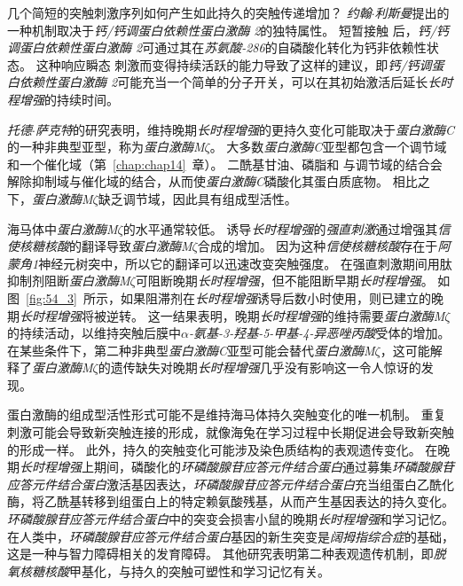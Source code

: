 几个简短的突触刺激序列如何产生如此持久的突触传递增加？
\textit{约翰$\cdot$利斯曼}提出的一种机制取决于\textit{钙/钙调蛋白依赖性蛋白激酶 2}的独特属性。
短暂接触  后，\textit{钙/钙调蛋白依赖性蛋白激酶 2}可通过其在\textit{苏氨酸-286}的自磷酸化转化为钙非依赖性状态。
这种响应瞬态  刺激而变得持续活跃的能力导致了这样的建议，即\textit{钙/钙调蛋白依赖性蛋白激酶 2}可能充当一个简单的分子开关，可以在其初始激活后延长\textit{长时程增强}的持续时间。


\textit{托德$\cdot$萨克特}的研究表明，维持晚期\textit{长时程增强}的更持久变化可能取决于\textit{蛋白激酶C}的一种非典型亚型，称为\textit{蛋白激酶M$\zeta$}。
大多数\textit{蛋白激酶C}亚型都包含一个调节域和一个催化域（第~\ref{chap:chap14}~章）。
二酰基甘油、磷脂和  与调节域的结合会解除抑制域与催化域的结合，从而使\textit{蛋白激酶C}磷酸化其蛋白质底物。
相比之下，\textit{蛋白激酶M$\zeta$}缺乏调节域，因此具有组成型活性。


海马体中\textit{蛋白激酶M$\zeta$}的水平通常较低。
诱导\textit{长时程增强}的\textit{强直刺激}通过增强其\textit{信使核糖核酸}的翻译导致\textit{蛋白激酶M$\zeta$}合成的增加。
因为这种\textit{信使核糖核酸}存在于\textit{阿蒙角1}神经元树突中，所以它的翻译可以迅速改变突触强度。
在强直刺激期间用肽抑制剂阻断\textit{蛋白激酶M$\zeta$}可阻断晚期\textit{长时程增强}，但不能阻断早期\textit{长时程增强}。
如图~\ref{fig:54_3}~所示，如果阻滞剂在\textit{长时程增强}诱导后数小时使用，则已建立的晚期\textit{长时程增强}将被逆转。
这一结果表明，晚期\textit{长时程增强}的维持需要\textit{蛋白激酶M$\zeta$}的持续活动，以维持突触后膜中\textit{$\alpha$-氨基-3-羟基-5-甲基-4-异恶唑丙酸}受体的增加。
在某些条件下，第二种非典型\textit{蛋白激酶C}亚型可能会替代\textit{蛋白激酶M$\zeta$}，这可能解释了\textit{蛋白激酶M$\zeta$}的遗传缺失对晚期\textit{长时程增强}几乎没有影响这一令人惊讶的发现。


蛋白激酶的组成型活性形式可能不是维持海马体持久突触变化的唯一机制。
重复刺激可能会导致新突触连接的形成，就像海兔在学习过程中长期促进会导致新突触的形成一样。
此外，持久的突触变化可能涉及染色质结构的表观遗传变化。
在晚期\textit{长时程增强}上期间，磷酸化的\textit{环磷酸腺苷应答元件结合蛋白}通过募集\textit{环磷酸腺苷应答元件结合蛋白}激活基因表达，\textit{环磷酸腺苷应答元件结合蛋白}充当组蛋白乙酰化酶，将乙酰基转移到组蛋白上的特定赖氨酸残基，从而产生基因表达的持久变化。
\textit{环磷酸腺苷应答元件结合蛋白}中的突变会损害小鼠的晚期\textit{长时程增强}和学习记忆。
在人类中，\textit{环磷酸腺苷应答元件结合蛋白}基因的新生突变是\textit{阔拇指综合症}的基础，这是一种与智力障碍相关的发育障碍。
其他研究表明第二种表观遗传机制，即\textit{脱氧核糖核酸}甲基化，与持久的突触可塑性和学习记忆有关。



